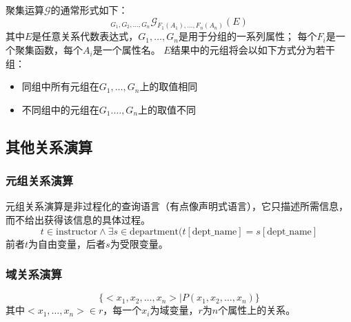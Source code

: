\begin{definition}[聚集运算]
聚集运算$\mathcal{G}$的通常形式如下：
\[{}_{G_1,G_2,\ldots,G_n}\mathcal{G}_{F_1(A_1),\ldots,F_n(A_n)}(E)\]
其中$E$是任意关系代数表达式，$G_1,\ldots,G_n$是用于分组的一系列属性；
每个$F_i$是一个聚集函数，每个$A_i$是一个属性名。
$E$结果中的元组将会以如下方式分为若干组：
\begin{itemize}
	\item 同组中所有元组在$G_1,\ldots,G_n$上的取值相同
	\item 不同组中的元组在$G_1.\ldots,G_n$上的取值不同
\end{itemize}
\end{definition}

\subsection{其他关系演算}
\subsubsection{元组关系演算}
元组关系演算是非过程化的查询语言（有点像声明式语言），它只描述所需信息，而不给出获得该信息的具体过程。
\[t\in\text{instructor}\land\exists s\in\text{department}(t[\text{dept\_name}]=s[\text{dept\_name}]\]
前者$t$为自由变量，后者$s$为受限变量。

\subsubsection{域关系演算}
\[\{<x_1,x_2,\ldots,x_n>\mid P(x_1,x_2,\ldots,x_n)\}\]
其中$<x_1,\ldots,x_n>\in r$，每一个$x_i$为域变量，$r$为$n$个属性上的关系。